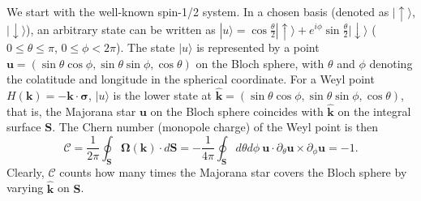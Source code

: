 \documentclass[aps,prl,floatfix,twocolumn,reprint]{revtex4}
\begin{document}
We start with the well-known spin-1/2 system. In a chosen basis (denoted as $%
|\uparrow \rangle $, $|\downarrow \rangle $), an arbitrary state can be
written as $|u\rangle =\cos \frac{\theta }{2}|\uparrow \rangle +e^{i\phi
}\sin \frac{\theta }{2}|\downarrow \rangle $ ($0\leq \theta \leq \pi $, $%
0\leq \phi < 2\pi $). The state $|u\rangle $ is represented by a point $%
\bm{u}=(\sin \theta \cos \phi ,\sin \theta \sin \phi ,\cos \theta )$ on the
Bloch sphere, with $\theta $ and $\phi $ denoting the colatitude and
longitude in the spherical coordinate. For a Weyl point $H(\bm{k})=-\bm{k}%
\cdot \bm{\sigma}$, $|u\rangle $ is the lower state at $\hat{\bm k}=(\sin \theta
\cos \phi ,\sin \theta \sin \phi ,\cos \theta )$, that is, the Majorana star
$\bm{u}$ on the Bloch sphere coincides with $\hat{\bm{k}}$ on the integral surface
$\bm{S}$. The Chern number (monopole charge) of the Weyl point is then
\begin{equation}
\mathcal{C}=\frac{1}{2\pi }\oint_{\bm{S}}\bm{\Omega}(\bm{k})\cdot d\bm{S}=-%
\frac{1}{4\pi }\oint_{\bm{S}}d\theta d\phi ~\bm{u}\cdot \partial _{\theta }%
\bm{u}\times \partial _{\phi }\bm{u}=-1.
\end{equation}%
Clearly, $\mathcal{C}$ counts how many times the Majorana star covers the
Bloch sphere by varying $\hat{\bm k}$ on $\bm S$.
\end{document}
